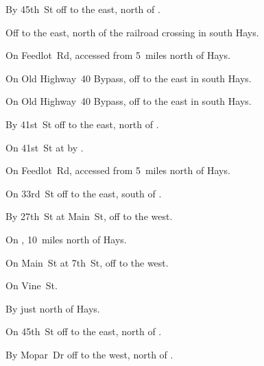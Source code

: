 

\begin{LocationList}

By 45th~St off  to the east, north of .

Off  to the east, north of the railroad crossing in south Hays.

On Feedlot~Rd, accessed from  5~miles north of Hays.

On Old Highway~40 Bypass, off  to the east in south Hays.

On Old Highway~40 Bypass, off  to the east in south Hays.

\Location{\GarageHQ \Garage}
By 41st~St off  to the east, north of .

\Location{\GasStation \Gas}
On 41st~St at  by .

On Feedlot~Rd, accessed from  5~miles north of Hays.

On 33rd~St off  to the east, south of .

By 27th~St at Main~St, off  to the west.

On , 10~miles north of Hays.

On Main~St at 7th~St, off  to the west.

\Location{\RecruitmentAgency \Recruitment}
On  Vine~St.

By  just north of Hays.

On 45th~St off  to the east, north of .

By Mopar~Dr off  to the west, north of .

\end{LocationList}
